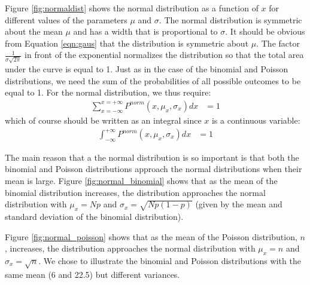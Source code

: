 Figure \ref{fig:normaldist} shows the normal distribution as a function of $x$ for different values of the parameters $\mu$ and $\sigma$. The normal distribution is symmetric about the mean $\mu$ and has a width that is proportional to $\sigma$. It should be obvious from Equation \ref{eqn:gaus} that the distribution is symmetric about $\mu$. The factor $\frac{1}{\sigma\sqrt{2\pi}}$ in front of the exponential normalizes the distribution so that the total area under the curve is equal to 1. Just as in the case of the binomial and Poisson distributions, we need the sum of the probabilities of all possible outcomes to be equal to 1. For the normal distribution, we thus require:
\begin{align*}
\sum_{x=-\infty}^{x=+\infty}P^{norm}(x,\mu_x,\sigma_x)dx &=1
\end{align*}
which of course should be written as an integral since $x$ is a continuous variable:
\begin{align}
\int_{-\infty}^{+\infty}P^{norm}(x,\mu_x,\sigma_x)dx &=1
\end{align}

The main reason that a the normal distribution is so important is that both the binomial and Poisson distributions approach the normal distributions when their mean is large. Figure \ref{fig:normal_binomial} shows that as the mean of the binomial distribution increases, the distribution approaches the normal distribution with $\mu_x=Np$  and $\sigma_x=\sqrt{Np(1-p)}$ (given by the mean and standard deviation of the binomial distribution).

 Figure \ref{fig:normal_poisson} shows that as the mean of the Poisson distribution, $n$, increases, the distribution approaches the normal distribution with $\mu_x=n$  and $\sigma_x=\sqrt{n}$. We chose to illustrate the binomial and Poisson distributions with the same mean (6 and 22.5) but different variances.


